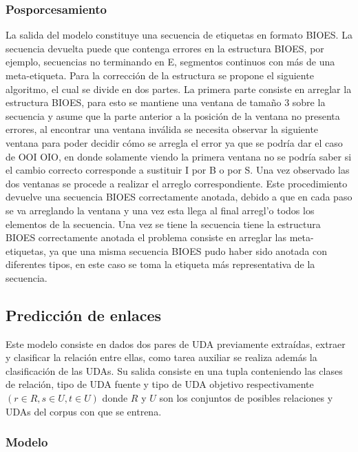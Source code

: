 \subsubsection{Posporcesamiento}

La salida del modelo constituye una secuencia de etiquetas en formato BIOES. La secuencia devuelta puede que contenga
errores en la estructura BIOES, por ejemplo, secuencias no terminando en E, segmentos continuos con más de una meta-etiqueta.
Para la corrección de la estructura se propone el siguiente algoritmo, el cual se divide en dos partes. La primera
parte consiste en arreglar la estructura BIOES, para esto se mantiene una ventana de tamaño
3 sobre la secuencia y asume que la parte anterior a la posición de la ventana no presenta errores, al encontrar una
ventana inválida se necesita observar la siguiente ventana para poder decidir cómo se arregla el error ya que se
podría dar el caso de OOI OIO, en donde solamente viendo la primera ventana no se podría saber si el cambio 
correcto corresponde a sustituir I por B o por S. Una vez observado las dos ventanas se procede a realizar el 
arreglo correspondiente. Este procedimiento devuelve una secuencia BIOES correctamente anotada, debido a que en 
cada paso se va arreglando la ventana y una vez esta llega al final arregl'o todos los elementos de la secuencia.
Una vez se tiene la secuencia tiene la estructura BIOES correctamente anotada el problema
consiste en arreglar las meta-etiquetas, ya que una misma secuencia BIOES pudo haber sido anotada con diferentes
tipos, en este caso se toma la etiqueta más representativa de la secuencia.

\subsection{Predicción de enlaces}

Este modelo consiste en dados dos pares de UDA previamente extraídas, 
extraer y clasificar la relación entre ellas, como tarea auxiliar se realiza además la clasificación 
de las UDAs. Su salida consiste en una tupla conteniendo las clases de relación, tipo de UDA fuente y 
tipo de UDA objetivo respectivamente $(r \in R, s \in U, t \in U)$ donde $R$ y $U$ son los conjuntos de 
posibles relaciones y UDAs del corpus con que se entrena.

\subsubsection{Modelo}

